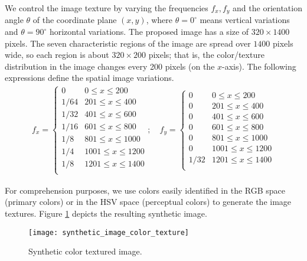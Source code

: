 We control the image texture by varying the frequencies $f_{x}, f_{y}$ and the orientation angle $\theta$ of the coordinate plane $(x, y)$, where $\theta=0^\circ$ means vertical variations and $\theta=90^\circ$ horizontal variations. The proposed image has a size of $320\times1400$ pixels. The seven characteristic regions of the image are spread over $1400$ pixels wide, so each region is about $320\times200$ pixels; that is, the color/texture distribution in the image changes every 200 pixels (on the $x$-axis). The following expressions define the spatial image variations.  
\begin{gather}
	f_{x} = 
	\begin{cases} 
      0    & 0\leq x\leq 200  \\
      1/64 & 201\leq x\leq 400  \\
      1/32 & 401\leq x\leq 600  \\
      1/16 & 601\leq x\leq 800  \\
      1/8  & 801\leq x\leq 1000  \\
      1/4  & 1001\leq x\leq 1200 \\   
      1/8  & 1201\leq x\leq 1400 \\ 
   	 \end{cases} \nonumber ; \quad
   	 f_{y} = \begin{cases} 
      0    & 0\leq x\leq 200  \\
      0    & 201\leq x\leq 400  \\
      0    & 401\leq x\leq 600  \\
      0    & 601\leq x\leq 800  \\
      0    & 801\leq x\leq 1000  \\
      0    & 1001\leq x\leq 1200 \\  
      1/32 & 1201\leq x\leq 1400 \\ 
   	 \end{cases} \nonumber  
\end{gather}

For comprehension purposes, we use colors easily identified in the RGB space (primary colors) or in the HSV space (perceptual colors) to generate the image textures. Figure \ref{fig:synthetic_color_texture_image} depicts the resulting synthetic image. 

\begin{figure}[!ht]
    \texttt{[image: synthetic\_image\_color\_texture]}
\caption{Synthetic color textured image.}\label{fig:synthetic_color_texture_image}
\end{figure}

